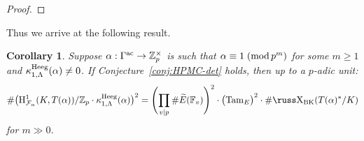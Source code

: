 \documentclass[10pt,reqno]{amsart}
\numberwithin{equation}{section}
\theoremstyle{plain}
\theoremstyle{definition}
\theoremstyle{definition}
\theoremstyle{plain}
\theoremstyle{plain}
\theoremstyle{plain}
\newtheorem{cor}[thm]{Corollary}
\theoremstyle{plain}
\theoremstyle{plain}
\theoremstyle{plain}
\newcommand{\Z}{\mathbb{Z}}
\newcommand{\Q}{\mathbb{Q}}
\def\sha{\hbox{\russ\char88}}
\newcommand{\Fcal}{\mathcal{F}}
\newcommand{\rH}{\mathrm{H}}
\begin{document}
\begin{proof}
%
\end{proof}

Thus we arrive at the following result.

\begin{cor}\label{cor:index-m}
Suppose $\alpha:\Gamma^{\rm ac}\rightarrow\Z_p^\times$ is such that $\alpha\equiv 1\;({\rm mod}\,p^m)$ for some $m\geq 1$ and $\kappa_{1,\Lambda}^{\rm Heeg}(\alpha)\neq 0$. If Conjecture~\ref{conj:HPMC-det} holds, then up to a $p$-adic unit: 
\[
\#\bigl(\rH^1_{\Fcal_\alpha}(K,T(\alpha))/\Z_p\cdot\kappa_{1,\Lambda}^{\rm Heeg}(\alpha)\bigr)^2=\Biggl(
\prod_{v\mid p}\#\widetilde{E}(\mathbb{F}_v)\Biggr)^2\cdot\bigl({\rm Tam}_E\bigr)^2\cdot\#\sha_{\rm BK}(T(\alpha)^*/K)
\]
for $m\gg 0$.
\end{cor}
\end{document}
